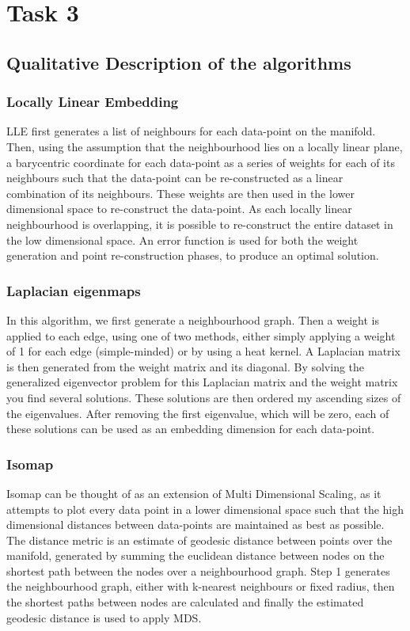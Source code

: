 \documentclass{article}
\begin{document}
\section{Task 3}
\subsection{Qualitative Description of the algorithms}
\subsubsection{Locally Linear Embedding}
LLE first generates a list of neighbours for each data-point on the manifold. Then, using the assumption that the neighbourhood lies on a locally linear plane, a barycentric coordinate for each data-point as a series of weights for each of its neighbours such that the data-point can be re-constructed as a linear combination of its neighbours. These weights are then used in the lower dimensional space to re-construct the data-point. As each locally linear neighbourhood is overlapping, it is possible to re-construct the entire dataset in the low dimensional space. An error function is used for both the weight generation and point re-construction phases, to produce an optimal solution.
\subsubsection{Laplacian eigenmaps}
In this algorithm, we first generate a neighbourhood graph. Then a weight is applied to each edge, using one of two methods, either simply applying a weight of 1 for each edge (simple-minded) or by using a heat kernel. A Laplacian matrix is then generated from the weight matrix and its diagonal. By solving the generalized eigenvector problem for this Laplacian matrix and the weight matrix you find several solutions. These solutions are then ordered my ascending sizes of the eigenvalues. After removing the first eigenvalue, which will be zero, each of these solutions can be used as an embedding dimension for each data-point.
\subsubsection{Isomap}
Isomap can be thought of as an extension of Multi Dimensional Scaling, as it attempts to plot every data point in a lower dimensional space such that the high dimensional distances between data-points are maintained as best as possible. The distance metric is an estimate of geodesic distance between points over the manifold, generated by summing the euclidean distance between nodes on the shortest path between the nodes over a neighbourhood graph. Step 1 generates the neighbourhood graph, either with k-nearest neighbours or fixed radius, then the shortest paths between nodes are calculated and finally the estimated geodesic distance is used to apply MDS.
\end{document}
